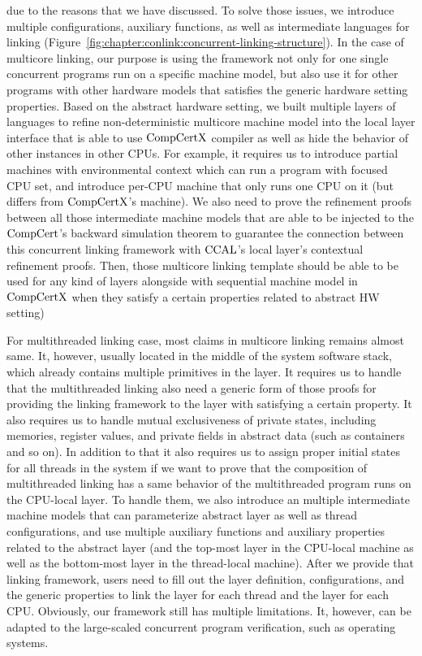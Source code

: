 due to the reasons that we have discussed. 
To solve those issues, 
we introduce multiple configurations, auxiliary functions, as well as intermediate languages for linking (Figure~\ref{fig:chapter:conlink:concurrent-linking-structure}). 
In the case of multicore linking, 
our purpose is using the framework not only for one single concurrent programs run on a specific machine model, 
but also use it for other programs with other hardware models that satisfies the generic hardware setting properties. 
Based on the abstract hardware setting, 
we built multiple layers of languages to refine non-deterministic multicore machine model 
into the local layer interface that is able to use $\mathrm{CompCertX}$ compiler as well as 
hide the behavior of other instances in other CPUs.
For example, 
it requires us to introduce partial machines with environmental context which can run a program with focused CPU set, 
and introduce per-CPU machine that only runs one CPU on it (but differs from $\mathrm{CompCertX}$'s machine). 
We also need to prove the refinement proofs between all those intermediate machine models
that are able to be injected to the $\mathrm{CompCert}$'s backward simulation theorem to guarantee the connection between 
this concurrent linking framework with $\mathrm{CCAL}$'s local layer's contextual refinement proofs. 
Then, those multicore linking template should be able to be used for any kind of layers alongside with sequential machine model in $\mathrm{CompCertX}$ when they satisfy a certain properties related to abstract HW setting)

For multithreaded linking case, most claims in multicore linking remains almost same. 
It, however, usually located in the middle of the system software stack, which already contains multiple 
primitives in the layer. 
It requires us to handle that the multithreaded linking also need a generic form of 
those proofs for providing the linking framework to the layer with satisfying a certain property. 
It also requires us to handle mutual exclusiveness of 
private states, including memories, register values, and private fields in abstract data (such as containers and so on).
In addition to that it also requires us to assign proper initial states for all threads in the system 
if we want to prove that the composition of multithreaded linking has a same behavior of 
the multithreaded program runs on the CPU-local layer. 
To handle them, we also introduce an
multiple intermediate machine models that can parameterize 
abstract layer as well as thread configurations, and use multiple auxiliary functions and auxiliary properties related to 
the abstract layer (and the top-most layer in the CPU-local machine as well as the bottom-most layer in the thread-local machine). 
After we provide that linking framework, users need to 
fill out the layer definition, configurations, and the generic properties to link the layer for each thread and the layer for each CPU.
Obviously, our framework still has multiple limitations. 
It, however, can be adapted to the large-scaled concurrent program verification, such as operating systems. 


